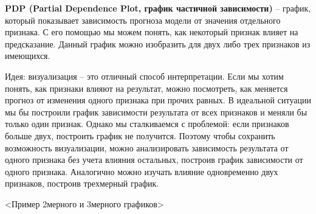 \textbf{PDP (Partial Dependence Plot, график частичной зависимости)} -- график, который показывает зависимость прогноза модели от значения отдельного признака. С его помощью мы можем понять, как некоторый признак влияет на предсказание. Данный график можно изобразить для двух либо трех признаков из имеющихся.

Идея: визуализация -- это отличный способ интерпретации. Если мы хотим понять, как признаки влияют на результат, можно посмотреть, как меняется прогноз от изменения одного признака при прочих равных. В идеальной ситуации мы бы построили график зависимости результата от всех признаков и меняли бы только один признак. Однако мы сталкиваемся с проблемой: если признаков больше двух, построить график не получится. Поэтому чтобы сохранить возможность визуализации, можно анализировать зависимость результата от одного признака без учета влияния остальных, построив график зависимости от одного признака. Аналогично можно изучать влияние одновременно двух признаков, построив трехмерный график.

<Пример 2мерного и 3мерного графиков>